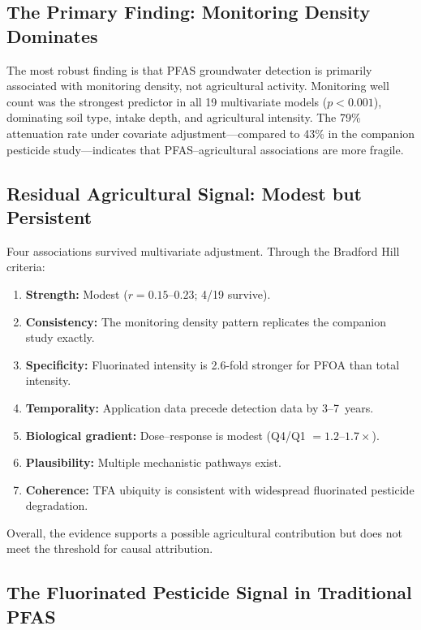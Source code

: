 \documentclass[12pt,a4paper]{article}
\begin{document}
\subsection{The Primary Finding: Monitoring Density Dominates}

The most robust finding is that PFAS groundwater detection is primarily associated with monitoring density, not agricultural activity. Monitoring well count was the strongest predictor in all 19 multivariate models ($p < 0.001$), dominating soil type, intake depth, and agricultural intensity. The 79\% attenuation rate under covariate adjustment---compared to 43\% in the companion pesticide study---indicates that PFAS--agricultural associations are more fragile.

\subsection{Residual Agricultural Signal: Modest but Persistent}

Four associations survived multivariate adjustment. Through the Bradford Hill criteria:

\begin{enumerate}
\item \textbf{Strength:} Modest ($r = 0.15$--$0.23$; 4/19 survive).
\item \textbf{Consistency:} The monitoring density pattern replicates the companion study exactly.
\item \textbf{Specificity:} Fluorinated intensity is 2.6-fold stronger for PFOA than total intensity.
\item \textbf{Temporality:} Application data precede detection data by 3--7~years.
\item \textbf{Biological gradient:} Dose--response is modest (Q4/Q1 $= 1.2$--$1.7\times$).
\item \textbf{Plausibility:} Multiple mechanistic pathways exist.
\item \textbf{Coherence:} TFA ubiquity is consistent with widespread fluorinated pesticide degradation.
\end{enumerate}

\noindent Overall, the evidence supports a possible agricultural contribution but does not meet the threshold for causal attribution.

\subsection{The Fluorinated Pesticide Signal in Traditional PFAS}
\end{document}
